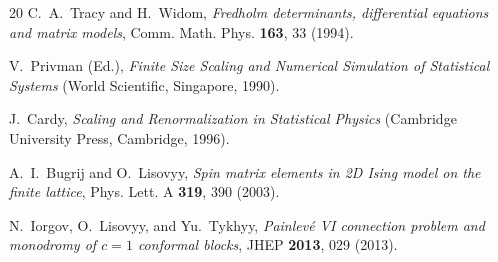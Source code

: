 \documentclass[11pt]{article}
\theoremstyle{definition}
\theoremstyle{remark}
\begin{document}
\begin{thebibliography}{20}
C.~A.~Tracy and H.~Widom,
\textit{Fredholm determinants, differential equations and matrix models},
Comm. Math. Phys. \textbf{163}, 33 (1994).

V.~Privman (Ed.),
\textit{Finite Size Scaling and Numerical Simulation of Statistical Systems}
(World Scientific, Singapore, 1990).

J.~Cardy,
\textit{Scaling and Renormalization in Statistical Physics}
(Cambridge University Press, Cambridge, 1996).

A.~I.~Bugrij and O.~Lisovyy,
\textit{Spin matrix elements in 2D Ising model on the finite lattice},
Phys. Lett. A \textbf{319}, 390 (2003).

N.~Iorgov, O.~Lisovyy, and Yu.~Tykhyy,
\textit{Painlev\'e VI connection problem and monodromy of $c=1$
  conformal blocks},
JHEP \textbf{2013}, 029 (2013).

\end{thebibliography}
\end{document}
